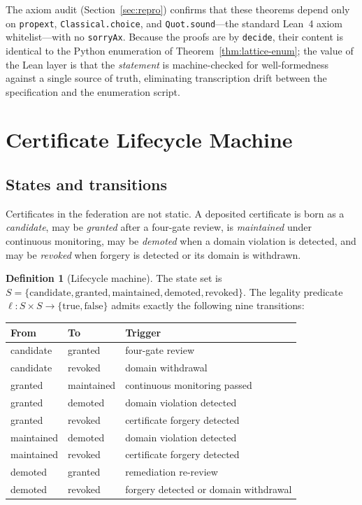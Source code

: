 \documentclass[11pt]{article}
\theoremstyle{definition}
\newtheorem{definition}[theorem]{Definition}
\theoremstyle{remark}
\begin{document}
The axiom audit (Section~\ref{sec:repro}) confirms that these theorems depend
only on \texttt{propext}, \texttt{Classical.choice}, and
\texttt{Quot.sound}---the standard Lean~4 axiom whitelist---with no
\texttt{sorryAx}. Because the proofs are by \texttt{decide}, their content is
identical to the Python enumeration of Theorem~\ref{thm:lattice-enum}; the
value of the Lean layer is that the \emph{statement} is machine-checked for
well-formedness against a single source of truth, eliminating
transcription drift between the specification and the enumeration script.

\section{Certificate Lifecycle Machine}\label{sec:lifecycle}

\subsection{States and transitions}

Certificates in the federation are not static. A deposited certificate is
born as a \emph{candidate}, may be \emph{granted} after a four-gate review,
is \emph{maintained} under continuous monitoring, may be \emph{demoted} when
a domain violation is detected, and may be \emph{revoked} when forgery is
detected or its domain is withdrawn.

\begin{definition}[Lifecycle machine]\label{def:k4}
The state set is
$S=\{\text{candidate},\text{granted},\text{maintained},\text{demoted},\text{revoked}\}$.
The legality predicate $\ell : S \times S \to \{\mathrm{true},\mathrm{false}\}$
admits exactly the following nine transitions:
\begin{center}
\begin{tabular}{lll}
\toprule
From & To & Trigger \\
\midrule
candidate & granted & four-gate review \\
candidate & revoked & domain withdrawal \\
granted & maintained & continuous monitoring passed \\
granted & demoted & domain violation detected \\
granted & revoked & certificate forgery detected \\
maintained & demoted & domain violation detected \\
maintained & revoked & certificate forgery detected \\
demoted & granted & remediation re-review \\
demoted & revoked & forgery detected or domain withdrawal \\
\bottomrule
\end{tabular}
\end{center}
\end{definition}
\end{document}
